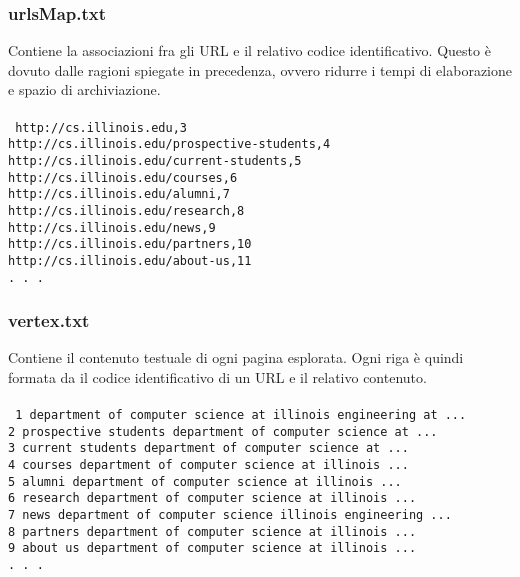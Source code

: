 \subsubsection{urlsMap.txt}
Contiene la associazioni fra gli URL e il relativo codice identificativo. Questo è dovuto dalle ragioni spiegate in precedenza, ovvero ridurre i tempi di elaborazione e spazio di archiviazione. 
\\\\
\texttt{
http://cs.illinois.edu,3\\
http://cs.illinois.edu/prospective-students,4\\
http://cs.illinois.edu/current-students,5\\
http://cs.illinois.edu/courses,6\\
http://cs.illinois.edu/alumni,7\\
http://cs.illinois.edu/research,8\\
http://cs.illinois.edu/news,9\\
http://cs.illinois.edu/partners,10\\
http://cs.illinois.edu/about-us,11\\
. . .\\
}
\subsubsection{vertex.txt}
Contiene il contenuto testuale di ogni pagina esplorata. Ogni riga è quindi formata da il codice identificativo di un URL e il relativo contenuto.
\\\\
\texttt{
1	department of computer science at illinois engineering at ...\\
2	prospective students department of computer science at ...\\
3	current students department of computer science at ...\\
4	courses department of computer science at illinois ...\\
5	alumni department of computer science at illinois ...\\
6	research department of computer science at illinois    ...\\
7	news department of computer science illinois engineering ...\\
8	partners department of computer science at illinois ...\\
9	about us department of computer science at illinois ...\\
. . .\\
}
